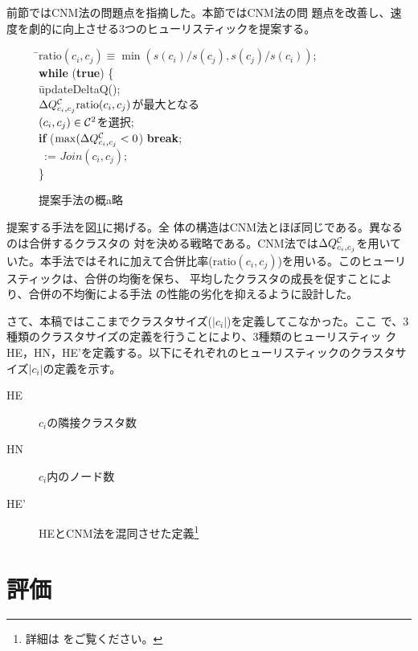 \documentclass [a4j,11pt] {jsarticle}
\begin{document}
前節ではCNM法の問題点を指摘した。本節ではCNM法の問
題点を改善し、速度を劇的に向上させる3つのヒューリスティックを提案する。

\begin {figure}
\begin {tabbing}
\hspace{.3\linewidth}\=$\mathrm {ratio}(c_i,c_j) \equiv \min(s(c_i)/s(c_j), s(c_j)/s(c_i))$; \\
\>\textbf {while} (\textbf {true}) \{\\
\>\quad\= updateDeltaQ(); \\
\>\>$\Delta Q^{{\cal C}}_{c_i,c_j}\mathrm {ratio}(c_i,c_j)$が最大となる\\
\>\>\quad $(c_i, c_j) \in {\cal C}^2$を選択;\\
\>\>\textbf {if} ($\max(\Delta Q^{{\cal C}}_{c_i,c_j} < 0$) \textbf {break};\\
\>\>\clustering\ := $\mathit {Join}(c_i, c_j)$;\\
\>\}
\end {tabbing}
  \caption {提案手法の概a略}
  \label {fig: tw algorithm}
\end {figure}

提案する手法を図\ref {fig: tw algorithm}に掲げる。全
体の構造はCNM法とほぼ同じである。異なるのは合併するクラスタの
対を決める戦略である。CNM法では$\Delta Q^{{\cal C}}_{c_i,c_j}$を用いていた。本手法ではそれに加えて合併比率($\mathrm
{ratio}(c_i, c_j)$)を用いる。このヒューリスティックは、合併の均衡を保ち、
平均したクラスタの成長を促すことにより、合併の不均衡による手法
の性能の劣化を抑えるように設計した。

さて、本稿ではここまでクラスタサイズ($|c_i|$)を定義してこなかった。ここ
で、3種類のクラスタサイズの定義を行うことにより、3種類のヒューリスティッ
クHE，HN，HE'を定義する。以下にそれぞれのヒューリスティックのクラスタサ
イズ$|c_i|$の定義を示す。

\begin{description}
	\item[HE]  $c_i$の隣接クラスタ数
	\item[HN]  $c_i$内のノード数
	\item[HE']  HEとCNM法を混同させた定義\footnote{詳細は \cite{Wakita07}をご覧ください。}
\end{description}


\section {評価}
\label {sect: evaluation}
\end{document}

